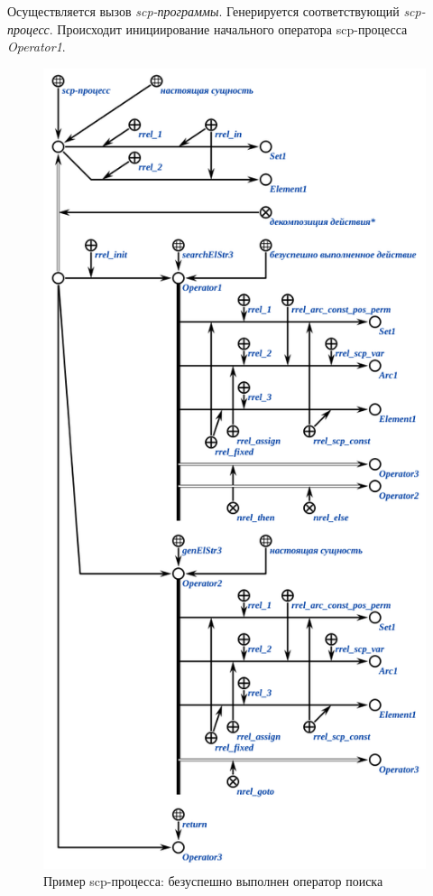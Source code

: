 Осуществляется вызов \textit{scp-программы}. Генерируется соответствующий \textit{scp-процесс}. Происходит инициирование начального оператора scp-процесса \textit{Operator1}.

\begin{figure}[H]
	\centering
	\includegraphics[scale=0.8]{images/part3/chapter_situation_management/process_example2.png}
	\caption{Пример scp-процесса: безуспешно выполнен оператор поиска}
	\label{fig:process_example2}
\end{figure}


